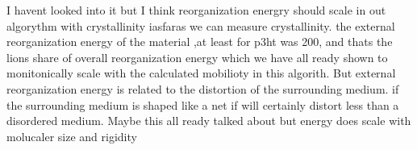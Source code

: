 I havent looked into it but I think reorganization energry should scale in out algorythm with crystallinity
iasfaras we can measure crystallinity. the external reorganization energy of the material ,at least for p3ht
was 200, and thats the lions share of overall reorganization energy which we have all ready shown to
monitonically scale with the calculated mobilioty in this algorith. But external reorganization energy is
related to the distortion of the surrounding medium. if the surrounding medium is shaped like a net if will
certainly distort less than a disordered medium. Maybe this all ready talked about but energy does scale with
molucaler size and rigidity \cite{McMahon2010a}

